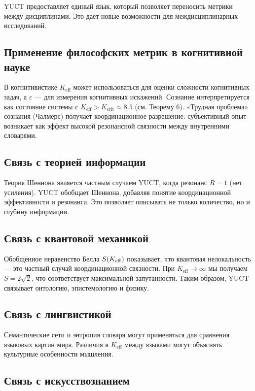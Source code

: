 \documentclass[12pt,a4paper]{article}
\newcommand{\eps}{\varepsilon}
\begin{document}
	YUCT предоставляет единый язык, который позволяет переносить метрики между дисциплинами. Это даёт новые возможности для междисциплинарных исследований.
	
	\subsection{Применение философских метрик в когнитивной науке}
	
	В когнитивистике \(K_{\mathrm{eff}}\) может использоваться для оценки сложности когнитивных задач, а \(\eps\) — для измерения когнитивных искажений. Сознание интерпретируется как состояние системы с \(K_{\mathrm{eff}} > K_{\mathrm{crit}} \approx 8.5\) (см. Теорему 6). «Трудная проблема» сознания (Чалмерс) получает координационное разрешение: субъективный опыт возникает как эффект высокой резонансной связности между внутренними словарями.
	
	\subsection{Связь с теорией информации}
	
	Теория Шеннона является частным случаем YUCT, когда резонанс \(R = 1\) (нет усиления). YUCT обобщает Шеннона, добавляя понятие координационной эффективности и резонанса. Это позволяет описывать не только количество, но и глубину информации.
	
	\subsection{Связь с квантовой механикой}
	
	Обобщённое неравенство Белла \(S(\Keff)\) показывает, что квантовая нелокальность — это частный случай координационной связности. При \(K_{\mathrm{eff}} \to \infty\) мы получаем \(S = 2\sqrt{2}\), что соответствует максимальной запутанности. Таким образом, YUCT связывает онтологию, эпистемологию и физику.
	
	\subsection{Связь с лингвистикой}
	
	Семантические сети и энтропия словаря могут применяться для сравнения языковых картин мира. Различия в \(K_{\mathrm{eff}}\) между языками могут объяснять культурные особенности мышления.
	
	\subsection{Связь с искусствознанием}
	
\end{document}
